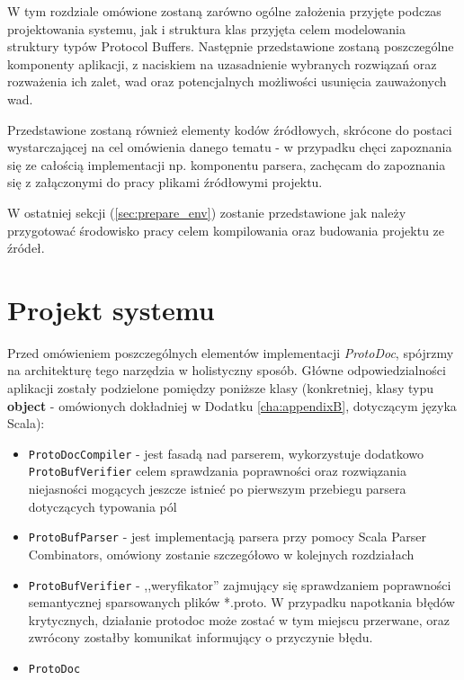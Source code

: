 \documentclass[pdflatex,11pt]{aghdpl}
\begin{document}
W tym rozdziale omówione zostaną zarówno ogólne założenia przyjęte podczas projektowania systemu, jak i struktura klas przyjęta celem
modelowania struktury typów Protocol Buffers. Następnie przedstawione zostaną poszczególne komponenty aplikacji, z naciskiem na uzasadnienie
wybranych rozwiązań oraz rozważenia ich zalet, wad oraz potencjalnych możliwości usunięcia zauważonych wad. 

Przedstawione zostaną również elementy kodów źródłowych, skrócone do postaci wystarczającej na cel omówienia danego tematu 
- w przypadku chęci zapoznania się ze całością implementacji np. komponentu parsera, zachęcam do zapoznania się 
z załączonymi do pracy plikami źródłowymi projektu.

W ostatniej sekcji (\ref{sec:prepare_env}) zostanie przedstawione jak należy przygotować środowisko pracy celem kompilowania oraz budowania projektu
ze źródeł.

\newpage
\section{Projekt systemu}
\label{sec:projekt_systemu}

Przed omówieniem poszczególnych elementów implementacji \textit{ProtoDoc}, 
spójrzmy na architekturę tego narzędzia w holistyczny sposób. Główne odpowiedzialności aplikacji zostały podzielone pomiędzy
poniższe klasy (konkretniej, klasy typu \textbf{object} - omówionych dokładniej w Dodatku \ref{cha:appendixB}, dotyczącym języka Scala):

\begin{itemize}
 \item \verb|ProtoDocCompiler| - jest fasadą nad parserem, wykorzystuje dodatkowo \verb|ProtoBufVerifier| celem sprawdzania poprawności oraz rozwiązania 
                                 niejasności mogących jeszcze istnieć po pierwszym przebiegu parsera dotyczących typowania pól
 \item \verb|ProtoBufParser| - jest implementacją parsera przy pomocy Scala Parser Combinators, omówiony zostanie szczegółowo w kolejnych rozdziałach
 \item \verb|ProtoBufVerifier| - ,,weryfikator'' zajmujący się sprawdzaniem poprawności semantycznej sparsowanych plików *.proto.
                                 W przypadku napotkania błędów krytycznych, działanie protodoc może zostać w tym miejscu przerwane,
                                 oraz zwrócony zostałby komunikat informujący o przyczynie błędu.
 \item \verb|ProtoDoc|
\end{itemize}
\end{document}
